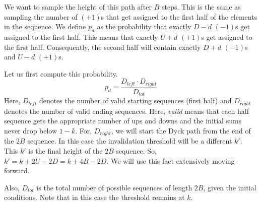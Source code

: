 We want to sample the height of this path after $B$ steps.
This is the same as sampling the number of $(+1)$s that get assigned to the first half of the elements in the sequence.
We define $p_d$ as the probability that exactly $D-d$ $(-1)$s get assigned to the first half.
This means that exactly $U+d$ $(+1)$s get assigned to the first half.
Consequently, the second half will contain exactly $D+d$ $(-1)$s and $U-d$ $(+1)$s.


Let us first compute this probability.
$$
p_d = \frac{D_{left}\cdot D_{right}}{D_{tot}}
$$
Here, $D_{left}$ denotes the number of valid starting sequences (first half)
and $D_{right}$ denotes the number of valid ending sequences.
Here, \textit{valid} means that each half sequence gets the appropriate number of ups and downs
and the initial sums never drop below $1-k$.
For, $D_{right}$, we will start the Dyck path from the end of the $2B$ sequence.
In this case the invalidation threshold will be a different $k'$.
This $k'$ is the final height of the $2B$ sequence. So, $k'=k+2U-2D = k+4B-2D$.
We will use this fact extensively moving forward.

Also, $D_{tot}$ is the total number of possible sequences of length $2B$, given the initial conditions.
Note that in this case the threshold remains at $k$.

